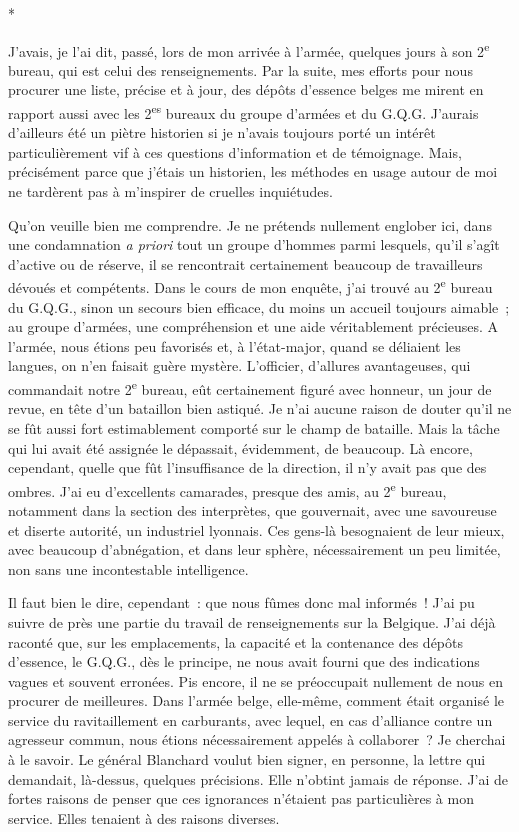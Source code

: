 \documentclass[french,twoside]{book} %
\begin{document}
\begin{center}
*\par
\end{center}

\noindent J’avais, je l’ai dit, passé, lors de mon arrivée à l’armée, quelques jours à son 2\textsuperscript{e} bureau, qui est celui des renseignements. Par la suite, mes efforts pour nous procurer une liste, précise et à jour, des dépôts d’essence belges me mirent en rapport aussi avec les 2\textsuperscript{es} bureaux du groupe d’armées et du G.Q.G. J’aurais d’ailleurs été un piètre historien si je n’avais toujours porté un intérêt particulièrement vif à ces questions d’information et de témoignage. Mais, précisément parce que j’étais un historien, les méthodes en usage autour de moi ne tardèrent pas à m’inspirer de cruelles inquiétudes.\par
Qu’on veuille bien me comprendre. Je ne prétends nullement englober ici, dans une condamnation {\itshape a priori} tout un groupe d’hommes parmi lesquels, qu’il s’agît d’active ou de réserve, il se rencontrait   certainement beaucoup de travailleurs dévoués et compétents. Dans le cours de mon enquête, j’ai trouvé au 2\textsuperscript{e} bureau du G.Q.G., sinon un secours bien efficace, du moins un accueil toujours aimable ; au groupe d’armées, une compréhension et une aide véritablement précieuses. A l’armée, nous étions peu favorisés et, à l’état-major, quand se déliaient les langues, on n’en faisait guère mystère. L’officier, d’allures avantageuses, qui commandait notre 2\textsuperscript{e} bu­reau, eût certainement figuré avec honneur, un jour de revue, en tête d’un bataillon bien astiqué. Je n’ai aucune raison de douter qu’il ne se fût aussi fort estimablement comporté sur le champ de bataille. Mais la tâche qui lui avait été assignée le dépassait, évidemment, de beaucoup. Là encore, cependant, quelle que fût l’insuffisance de la direction, il n’y avait pas que des ombres. J’ai eu d’excellents cama­rades, presque des amis, au 2\textsuperscript{e} bureau, notamment dans la section des interprètes, que gouvernait, avec une savoureuse et diserte autorité, un industriel lyonnais. Ces gens-là besognaient de leur mieux, avec beaucoup d’abnégation, et dans leur sphère, nécessairement un peu limitée, non sans une incontestable intelligence.\par
Il faut bien le dire, cependant : que nous fûmes donc mal informés ! J’ai pu suivre de près une partie du travail de renseignements sur la Belgique. J’ai déjà raconté que, sur les emplacements, la capacité et la contenance des dépôts d’essence, le G.Q.G., dès le principe, ne nous avait fourni que des indications vagues et souvent erronées. Pis encore, il ne se préoccupait nullement de nous en procurer de meilleures. Dans l’armée belge, elle-même, comment était organisé le service du ravitaillement en carburants, avec lequel, en cas d’alliance contre un agresseur commun, nous étions nécessairement appelés à collaborer ? Je cherchai à le savoir. Le général Blanchard voulut bien signer, en personne, la lettre qui demandait, là-dessus, quelques précisions. Elle   n’obtint jamais de réponse. J’ai de fortes raisons de penser que ces ignorances n’étaient pas particulières à mon service. Elles tenaient à des raisons diverses.\par
\end{document}
